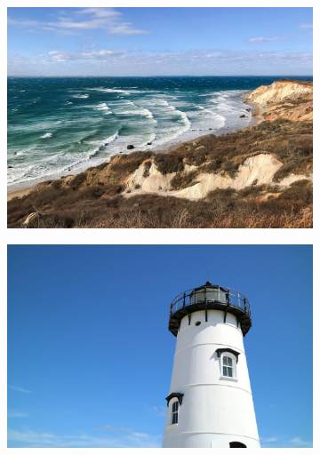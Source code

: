 \documentclass[
  a4paper,
  DIV=11,
  numbers=noendperiod,
  oneside,
  open=any]{scrreprt}
\begin{document}
\begin{figure}

\begin{minipage}{0.50\linewidth}

\begin{figure}[H]

{\centering \includegraphics{images/mv-1.jpg}

}


\end{figure}%

\end{minipage}%
%
\begin{minipage}{0.50\linewidth}

\begin{figure}[H]

{\centering \includegraphics{images/mv-3.jpg}

}
\end{figure}
\end{minipage}
\end{figure}
\end{document}
